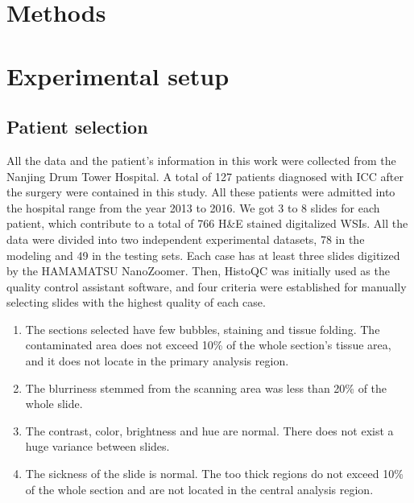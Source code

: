 \documentclass[num-refs]{wiley-article}
\begin{document}
\section{Methods}\label{method}

\section{Experimental setup}\label{experiment}

\subsection{Patient selection}
All the data and the patient's information in this work were collected from the Nanjing Drum Tower Hospital. A total of 127 patients diagnosed with ICC after the surgery were contained in this study. All these patients were admitted into the hospital range from the year 2013 to 2016. We got 3 to 8 slides for each patient, which contribute to a total of 766 H\&E stained digitalized WSIs. All the data were divided into two independent experimental datasets, 78 in the modeling and 49 in the testing sets. Each case has at least three slides digitized by the HAMAMATSU NanoZoomer. Then, HistoQC \cite{Janowczyk2019} was initially used as the quality control assistant software, and four criteria were established for manually selecting slides with the highest quality of each case.  
\begin{enumerate}
\item The sections selected have few bubbles, staining and tissue folding. The contaminated area does not exceed 10\% of the whole section's tissue area, and it does not locate in the primary analysis region.    
\item The blurriness stemmed from the scanning area was less than 20\% of the whole slide.    
\item The contrast, color, brightness and hue are normal. There does not exist a huge variance between slides.  
\item The sickness of the slide is normal. The too thick regions do not exceed 10\% of the whole section and are not located in the central analysis region.   
\end{enumerate}
\end{document}
